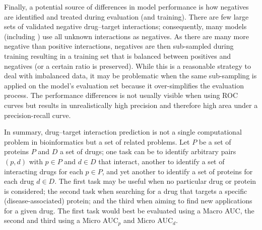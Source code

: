 \documentclass{bioinfo}
\begin{document}
Finally, a potential source of differences in model performance is how
negatives are identified and treated during evaluation (and
training). There are few large sets of validated negative drug--target
interactions; consequently, many models (including \name{}) use all
unknown interactions as negatives. As there are many more negative
than positive interactions, negatives are then sub-sampled during
training resulting in a training set that is balanced between
positives and negatives (or a certain ratio is preserved). While this
is a reasonable strategy to deal with imbalanced data, it may be
problematic when the same sub-sampling is applied on the model's
evaluation set because it over-simplifies the evaluation process. The
performance differences is not usually visible when using ROC curves
but results in unrealistically high precision and therefore high area
under a precision-recall curve.

In summary, drug--target interaction prediction is not a single
computational problem in bioinformatics but a set of related
problems. Let $P$ be a set of proteins $P$ and $D$ a set of drugs; one
task can be to identify arbitrary pairs $(p,d)$ with $p \in P$ and
$d \in D$ that interact, another to identify a set of interacting
drugs for each $p \in P$, and yet another to identify a set of
proteins for each drug $d \in D$. The first task may be useful when no
particular drug or protein is considered; the second task when
searching for a drug that targets a specific (disease-associated)
protein; and the third when aiming to find new applications for a
given drug. The first task would best be evaluated using a Macro AUC,
the second and third using a Micro AUC$_p$ and Micro AUC$_d$.


\end{document}
